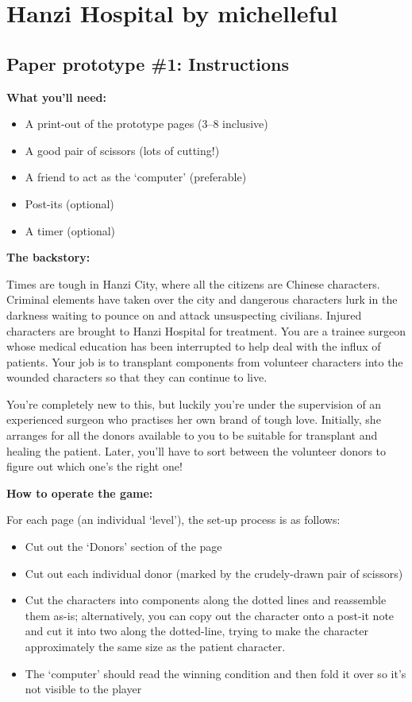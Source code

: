 \documentclass{article}
\begin{document}
\section*{Hanzi Hospital by michelleful}
\subsection*{Paper prototype \#1: Instructions}

\bigskip\bigskip

\textbf{What you'll need:}
\begin{itemize}
  \item A print-out of the prototype pages (3--8 inclusive)
  \item A good pair of scissors (lots of cutting!)
  \item A friend to act as the `computer' (preferable)
  \item Post-its (optional)
  \item A timer (optional)
\end{itemize}

\bigskip

\noindent\textbf{The backstory:}

 Times are tough in Hanzi City, where all the citizens are Chinese characters. Criminal elements have taken over the city and dangerous characters lurk in the darkness waiting to pounce on and attack unsuspecting civilians. Injured characters are brought to Hanzi Hospital for treatment. You are a trainee surgeon whose medical education has been interrupted to help deal with the influx of patients. Your job is to transplant components from volunteer characters into the wounded characters so that they can continue to live.
 
You're completely new to this, but luckily you're under the supervision of an experienced surgeon who practises her own brand of tough love. Initially, she arranges for all the donors available to you to be suitable for transplant and healing the patient. Later, you'll have to sort between the volunteer donors to figure out which one's the right one!

\bigskip

\noindent\textbf{How to operate the game:}

For each page (an individual `level'), the set-up process is as follows:

\begin{itemize}
  \item Cut out the `Donors' section of the page
  \item Cut out each individual donor (marked by the crudely-drawn pair of scissors)
  \item Cut the characters into components along the dotted lines and reassemble them as-is; alternatively, you can copy out the character onto a post-it note and cut it into two along the dotted-line, trying to make the character approximately the same size as the patient character.
  \item The `computer' should read the winning condition and then fold it over so it's not visible to the player
\end{itemize}
\end{document}
